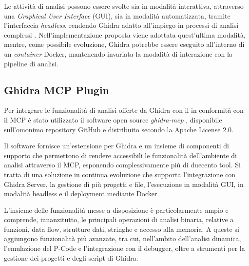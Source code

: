 
Le attività di analisi possono essere svolte sia in modalità interattiva, attraverso una \emph{Graphical User Interface} (GUI), sia in modalità automatizzata, tramite l'interfaccia \emph{headless}, rendendo Ghidra adatto all'impiego in processi di analisi complessi \cite{nance2026ghidrabook}. Nell'implementazione proposta viene adottata quest'ultima modalità, mentre, come possibile evoluzione, Ghidra potrebbe essere eseguito all'interno di un \emph{container} Docker, mantenendo invariata la modalità di interazione con la pipeline di analisi.


\subsection{Ghidra MCP Plugin} %

Per integrare le funzionalità di analisi offerte da Ghidra con il \sreagent{} in conformità con il MCP è stato utilizzato il software open source \emph{ghidra-mcp} \cite{bethington2026ghidramcp}, disponibile sull'omonimo repository GitHub e distribuito secondo la Apache License 2.0.

Il software fornisce un'estensione per Ghidra e un insieme di componenti di supporto che permettono di rendere accessibili le funzionalità dell'ambiente di analisi attraverso il MCP, esponendo complessivamente più di duecento tool. Si tratta di una soluzione in continua evoluzione che supporta l'integrazione con Ghidra Server, la gestione di più progetti e file, l'esecuzione in modalità GUI, in modalità headless e il deployment mediante Docker.


L'insieme delle funzionalità messe a disposizione è particolarmente ampio e comprende, innanzitutto, le principali operazioni di analisi binaria, relative a funzioni, data flow, strutture dati, stringhe e accesso alla memoria. A queste si aggiungono funzionalità più avanzate, tra cui, nell'ambito dell'analisi dinamica, l'emulazione del P-Code e l'integrazione con il debugger, oltre a strumenti per la gestione dei progetti e degli script di Ghidra.


